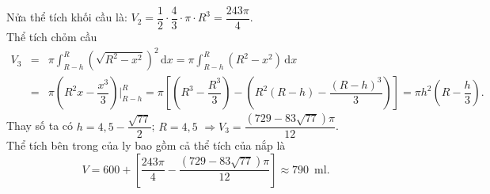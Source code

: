 \begin{ex}
{\begin{itemchoice}
			Nửa thể tích khối cầu là:  $V_2=\dfrac{1}{2}\cdot\dfrac{4}{3}\cdot\pi\cdot R^3=\dfrac{243\pi}{4}$.\\
			 Thể tích chỏm cầu
			 \allowdisplaybreaks
			\begin{eqnarray*}
				 V_3&=&\pi\displaystyle\int_{R-h}^R\left(\sqrt{R^2-x^2}\right)^2\,\mathrm{d}x=\pi\displaystyle\int_{R-h}^R\left(R^2-x^2\right)\,\mathrm{d}x\\
				 &=&\pi\left(R^2x-\dfrac{x^3}{3}\right)\Big|_{R-h}^R=\pi\left[\left(R^3-\dfrac{R^3}{3}\right)-\left(R^2\left(R-h\right)-\dfrac{\left(R-h\right)^3}{3}\right)\right]=\pi{h^2}\left(R-\dfrac{h}{3}\right).
			\end{eqnarray*}
			Thay số ta có $h=4{,}5-\dfrac{\sqrt{77}}{2}$; $R=4{,}5$  $\Rightarrow{V_3}=\dfrac{\left(729-83\sqrt{77}\right)\pi}{12}$.\\
			Thể tích  bên trong của ly bao gồm cả thể tích của nắp là
			\[V=600+\left[\dfrac{243\pi}{4}-\dfrac{\left(729-83\sqrt{77}\right)\pi}{12}\right]\approx  790\, \text{ ml}.\]
		\end{itemchoice}
	} 
\end{ex}

